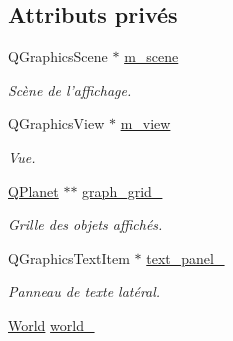 \subsection*{Attributs privés}
\begin{DoxyCompactItemize}
\item 
\hypertarget{classDisplayer_a2b3b84d51d4bb077d52ede2a2abc6191}{Q\-Graphics\-Scene $\ast$ \hyperlink{classDisplayer_a2b3b84d51d4bb077d52ede2a2abc6191}{m\-\_\-scene}}\label{classDisplayer_a2b3b84d51d4bb077d52ede2a2abc6191}

\begin{DoxyCompactList}\small\item\em Scène de l'affichage. \end{DoxyCompactList}\item 
\hypertarget{classDisplayer_a793b9f323b4d24428f1376528b537515}{Q\-Graphics\-View $\ast$ \hyperlink{classDisplayer_a793b9f323b4d24428f1376528b537515}{m\-\_\-view}}\label{classDisplayer_a793b9f323b4d24428f1376528b537515}

\begin{DoxyCompactList}\small\item\em Vue. \end{DoxyCompactList}\item 
\hypertarget{classDisplayer_a970d6b412a61cc28987227ed20256d77}{\hyperlink{classQPlanet}{Q\-Planet} $\ast$$\ast$ \hyperlink{classDisplayer_a970d6b412a61cc28987227ed20256d77}{graph\-\_\-grid\-\_\-}}\label{classDisplayer_a970d6b412a61cc28987227ed20256d77}

\begin{DoxyCompactList}\small\item\em Grille des objets affichés. \end{DoxyCompactList}\item 
\hypertarget{classDisplayer_a3e80d86dcf40825e1f7d71c2947e5cd3}{Q\-Graphics\-Text\-Item $\ast$ \hyperlink{classDisplayer_a3e80d86dcf40825e1f7d71c2947e5cd3}{text\-\_\-panel\-\_\-}}\label{classDisplayer_a3e80d86dcf40825e1f7d71c2947e5cd3}

\begin{DoxyCompactList}\small\item\em Panneau de texte latéral. \end{DoxyCompactList}\item 
\hypertarget{classDisplayer_acf5e0801f0353ad1300ea901f8038fb5}{\hyperlink{classWorld}{World} \hyperlink{classDisplayer_acf5e0801f0353ad1300ea901f8038fb5}{world\-\_\-}}\label{classDisplayer_acf5e0801f0353ad1300ea901f8038fb5}


\end{DoxyCompactItemize}
